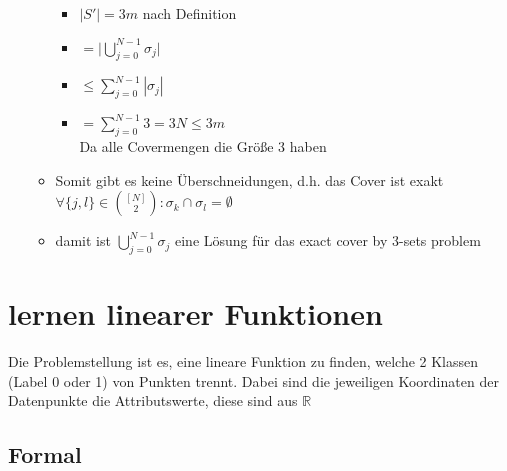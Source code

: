 \documentclass[12pt,a4paper]{article}
\begin{document}
\begin{itemize}
\begin{itemize}
\begin{itemize}
\item $|S'| = 3m$ nach Definition
\item $\displaystyle = \big\vert \bigcup_{j=0}^{N-1} \sigma_j \big\vert$
\item $\displaystyle \leq \sum_{j=0}^{N-1} |\sigma_j |$
\item $\displaystyle = \sum_{j=0}^{N-1} 3 = 3N \leq 3m$\\
Da alle Covermengen die Größe 3 haben
\end{itemize}
\item Somit gibt es keine Überschneidungen, d.h. das Cover ist exakt\\
$\forall\{j,l\}\in\binom{[N]}{2}: \sigma_k\cap\sigma_l = \emptyset$
\item damit ist $\displaystyle \bigcup_{j=0}^{N-1} \sigma_j$ eine Lösung für das exact cover by 3-sets problem
\end{itemize}
\end{itemize}
\section{lernen linearer Funktionen}
Die Problemstellung ist es, eine lineare Funktion zu finden, welche 2 Klassen (Label 0 oder 1) von Punkten trennt. Dabei sind die jeweiligen Koordinaten der Datenpunkte die Attributswerte, diese sind aus $\mathbb{R}$
\subsection{Formal}
\end{document}
